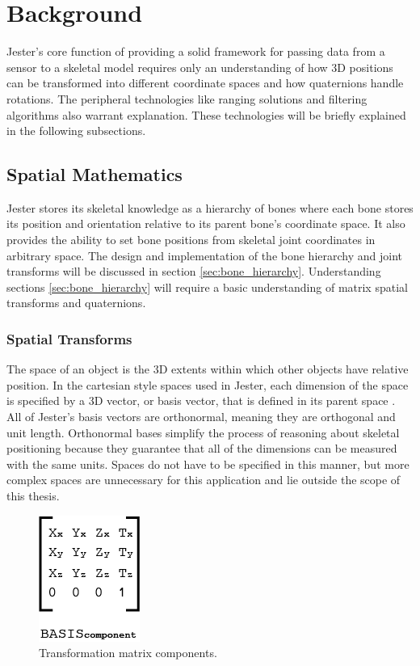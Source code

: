 \chapter{Background}

Jester’s core function of providing a solid framework for passing data from a sensor to a skeletal model requires only an understanding of how 3D positions can be transformed into different coordinate spaces and how quaternions handle rotations. The peripheral technologies like ranging solutions and filtering algorithms also warrant explanation. These technologies will be briefly explained in the following subsections.

\section{Spatial Mathematics}

Jester stores its skeletal knowledge as a hierarchy of bones where each bone stores its position and orientation relative to its parent bone’s coordinate space. It also provides the ability to set bone positions from skeletal joint coordinates in arbitrary space. The design and implementation of the bone hierarchy and joint transforms will be discussed in section \ref{sec:bone_hierarchy}. Understanding sections \ref{sec:bone_hierarchy} will require a basic understanding of matrix spatial transforms and quaternions.

\subsection{Spatial Transforms}

The space of an object is the 3D extents within which other objects have relative position. In the cartesian style spaces used in Jester, each dimension of the space is specified by a 3D vector, or basis vector, that is defined in its parent space \cite{gortler2012foundations}. All of Jester’s basis vectors are orthonormal, meaning they are orthogonal and unit length. Orthonormal bases simplify the process of reasoning about skeletal positioning because they guarantee that all of the dimensions can be measured with the same units. Spaces do not have to be specified in this manner, but more complex spaces are unnecessary for this application and lie outside the scope of this thesis. 

\begin{figure}[h]
\centering
\includegraphics[]{figures/transMatrix}
\caption{Transformation matrix components.}
\label{fig:transformation_mat}
\end{figure}


